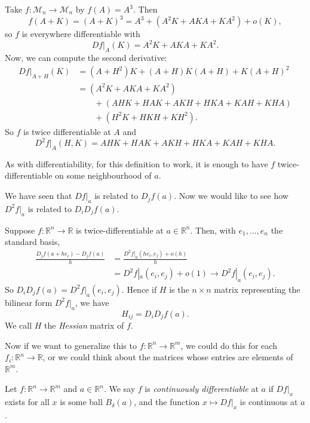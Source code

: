 \documentclass[12pt]{article}
\begin{document}
\begin{exbox}
	Take $f : \mathcal{M}_n \to \mathcal{M}_n$ by $f(A) = A^3$. Then
	\[
	f(A+K) = (A+K)^3 = A^3 + (A^2K + AKA + KA^2) + o(K)
	,\]
	so $f$ is everywhere differentiable with
	\[
	Df|_A(K) = A^2K + AKA + KA^2
	.\]
	Now, we can compute the second derivative:
	\begin{align*}
		Df|_{A+H}(K) &= (A+H^2)K + (A+H)K(A+H) + K(A+H)^2 \\
			     &= (A^2K + AKA + KA^2) \\
			     &\qquad + (AHK + HAK + AKH + HKA + KAH + KHA) \\
			     &\qquad + (H^2K + HKH + KH^2).
	\end{align*}
	So $f$ is twice differentiable at $A$ and
	\[
	D^2f|_A(H,K) = AHK + HAK + AKH + HKA + KAH + KHA
	.\]
\end{exbox}

\begin{remark}
	As with differentiability, for this definition to work, it is enough to have $f$ twice-differentiable on some neighbourhood of $a$.
\end{remark}

We have seen that $Df|_a$ is related to $D_jf(a)$. Now we would like to see how $D^2f|_a$ is related to $D_iD_jf(a)$.

Suppose $f : \mathbb{R}^{n} \to \mathbb{R}$ is twice-differentiable at $a \in \mathbb{R}^{n}$. Then, with $e_1, \ldots, e_n$ the standard basis,
\begin{align*}
	\frac{D_jf(a+he_i) - D_jf(a)}{h} &= \frac{D^2f|_a(he_i, e_j) + o(h)}{h} \\
					 &= D^2f|_a(e_i, e_j) + o(1) \to D^2f|_a(e_i, e_j).
\end{align*}
So $D_iD_jf(a) = D^2f|_a(e_i, e_j)$. Hence if $H$ is the $n \times n$ matrix representing the bilinear form $D^2f|_a$, we have
\[
H_{ij} = D_iD_j f(a)
.\]
We call $H$ the \textit{Hessian} matrix of $f$.

Now if we want to generalize this to $f : \mathbb{R}^{n} \to \mathbb{R}^{m}$, we could do this for each $f_i : \mathbb{R}^{n} \to \mathbb{R}$, or we could think about the matrices whose entries are elements of $\mathbb{R}^{m}$.

\begin{definition}
	Let $f : \mathbb{R}^{n} \to \mathbb{R}^{m}$ and $a \in \mathbb{R}^{n}$. We say $f$ is \textit{continuously differentiable} at $a$ if $Df|_x$ exists for all $x$ is some ball $B_{\delta}(a)$, and the function $x \mapsto Df|_x$ is continuous at $a$.
\end{definition}
\end{document}
